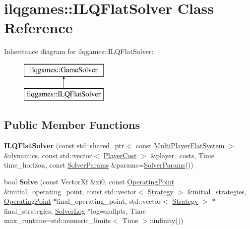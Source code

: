 \hypertarget{classilqgames_1_1_i_l_q_flat_solver}{}\section{ilqgames\+:\+:I\+L\+Q\+Flat\+Solver Class Reference}
\label{classilqgames_1_1_i_l_q_flat_solver}
Inheritance diagram for ilqgames\+:\+:I\+L\+Q\+Flat\+Solver\+:\begin{figure}[H]
\begin{center}
\leavevmode
\includegraphics[height=2.000000cm]{classilqgames_1_1_i_l_q_flat_solver}
\end{center}
\end{figure}
\subsection*{Public Member Functions}
\begin{DoxyCompactItemize}
\item 
{\bfseries I\+L\+Q\+Flat\+Solver} (const std\+::shared\+\_\+ptr$<$ const \hyperlink{classilqgames_1_1_multi_player_flat_system}{Multi\+Player\+Flat\+System} $>$ \&dynamics, const std\+::vector$<$ \hyperlink{classilqgames_1_1_player_cost}{Player\+Cost} $>$ \&player\+\_\+costs, Time time\+\_\+horizon, const \hyperlink{structilqgames_1_1_solver_params}{Solver\+Params} \&params=\hyperlink{structilqgames_1_1_solver_params}{Solver\+Params}())\hypertarget{classilqgames_1_1_i_l_q_flat_solver_a66d3b8710861b90c67ea854b4722b2a2}{}\label{classilqgames_1_1_i_l_q_flat_solver_a66d3b8710861b90c67ea854b4722b2a2}

\item 
bool {\bfseries Solve} (const Vector\+Xf \&xi0, const \hyperlink{structilqgames_1_1_operating_point}{Operating\+Point} \&initial\+\_\+operating\+\_\+point, const std\+::vector$<$ \hyperlink{structilqgames_1_1_strategy}{Strategy} $>$ \&initial\+\_\+strategies, \hyperlink{structilqgames_1_1_operating_point}{Operating\+Point} $\ast$final\+\_\+operating\+\_\+point, std\+::vector$<$ \hyperlink{structilqgames_1_1_strategy}{Strategy} $>$ $\ast$final\+\_\+strategies, \hyperlink{classilqgames_1_1_solver_log}{Solver\+Log} $\ast$log=nullptr, Time max\+\_\+runtime=std\+::numeric\+\_\+limits$<$ Time $>$\+::infinity())\hypertarget{classilqgames_1_1_i_l_q_flat_solver_a1229821b72869b3031d51a1afbb34eb2}{}\label{classilqgames_1_1_i_l_q_flat_solver_a1229821b72869b3031d51a1afbb34eb2}

\end{DoxyCompactItemize}
